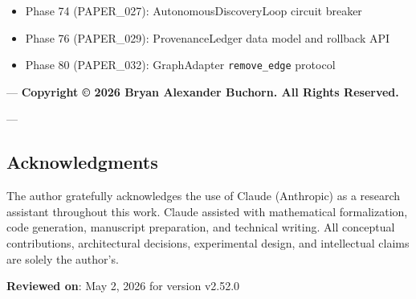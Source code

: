 \begin{itemize}
\item Phase 74 (PAPER\_027): AutonomousDiscoveryLoop circuit breaker
\item Phase 76 (PAPER\_029): ProvenanceLedger data model and rollback API
\item Phase 80 (PAPER\_032): GraphAdapter \texttt{remove\_edge} protocol

\end{itemize}
---
\textbf{Copyright © 2026 Bryan Alexander Buchorn. All Rights Reserved.}

---
\subsection{Acknow\-ledgments}

The author gratefully ackno\-wledges the use of Claude (Anthropic) as a research assistant throughout this work. Claude assisted with mathe\-matical forma\-lization, code generation, manuscript preparation, and technical writing. All conceptual contr\-ibutions, archi\-tectural decisions, exper\-imental design, and intel\-lectual claims are solely the author's.

\textbf{Reviewed on}: May 2, 2026 for version v2.52.0
